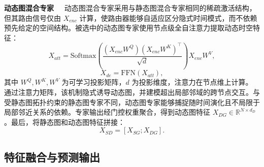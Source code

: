 \noindent\textbf{动态图混合专家\ \ } 动态图混合专家采用与静态图混合专家相同的稀疏激活结构，但其路由信号仅由 $X_{enc}$ 计算，使路由器能够自适应区分隐式时间模式，而不依赖预先给定的空间结构。被选中的动态图专家使用节点级全自注意力提取动态时空特征：
\begin{equation}
    X_{att}=\mathrm{Softmax}\!\left(\frac{\left(X_{enc}W^{Q}\right)\left(X_{enc}W^{K}\right)^{\top}}{\sqrt{d}}\right)X_{enc}W^{V},
\end{equation}
\begin{equation}
    X_{de}=\mathrm{FFN}\!\left(X_{att}\right),
\end{equation}
其中 $W^{Q},W^{K},W^{V}$ 为可学习投影矩阵，$d$ 为投影维度，注意力在节点维上计算。
通过注意力矩阵，该机制隐式诱导动态图，并建模超出局部邻域的跨节点交互。与受静态图拓扑约束的静态图专家不同，动态图专家能够捕捉随时间演化且不局限于局部邻近关系的依赖。专家输出经门控权重聚合，得到动态图特征 $X_{DG}\in\mathbb{R}^{N\times d_D}$。最后，将静态图和动态图特征拼接：
\begin{equation}
X_{SD}=\left[X_{SG};X_{DG}\right].
\end{equation}

\subsection{特征融合与预测输出}
\label{sec:ch4_fusion}

